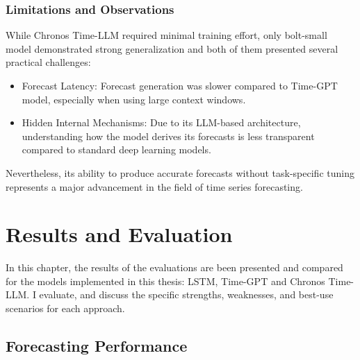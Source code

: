 \documentclass{article}
\begin{document}
\subsubsection{Limitations and Observations}
While Chronos Time-LLM required minimal training effort, only bolt-small model demonstrated strong generalization and both of them presented several practical challenges:

\begin{itemize}
    \item Forecast Latency: Forecast generation was slower compared to Time-GPT model, especially when using large context windows.
\end{itemize}

\begin{itemize}
    \item Hidden Internal Mechanisms: Due to its LLM-based architecture, understanding how the model derives its forecasts is less transparent compared to standard deep learning models.
\end{itemize}

Nevertheless, its ability to produce accurate forecasts without task-specific tuning represents a major advancement in the field of time series forecasting.

\newpage
\section{Results and Evaluation}
In this chapter, the results of the evaluations are been presented and compared for the models implemented in this thesis: LSTM, Time-GPT and Chronos Time-LLM. I evaluate, and discuss the specific strengths, weaknesses, and best-use scenarios for each approach.

\subsection{Forecasting Performance}
\end{document}
